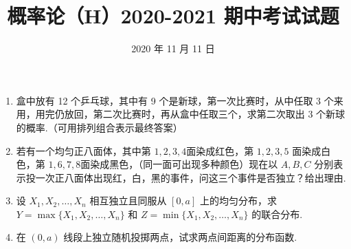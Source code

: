 \documentclass{ctexart}
\title{\vspace{-4em}\textbf{概率论（H）2020-2021 期中考试试题}}
\date{\vspace{-2em}2020 年 11 月 11 日}
\begin{document}
\maketitle
\thispagestyle{empty}

\begin{enumerate}
    \item 盒中放有 12 个乒乓球，其中有 9 个是新球，第一次比赛时，从中任取 3 个来用，用完仍放回，第二次比赛时，再从盒中任取三个，求第二次取出 3 个新球的概率.（可用排列组合表示最终答案）\vspace{10em}

    \item 若有一个均匀正八面体，其中第 $ 1, 2, 3, 4 $面染成红色，第 $ 1, 2, 3, 5 $ 面染成白色，第 $ 1, 6, 7, 8 $面染成黑色，（同一面可出现多种颜色）现在以 $ A, B, C $ 分别表示投一次正八面体出现红，白，黑的事件，问这三个事件是否独立？给出理由.\vspace{10em}

    \item 设 $ X_1, X_2, \ldots, X_n $ 相互独立且同服从 $ [0, a] $ 上的均匀分布，求 $ Y = \max\{X_1, X_2, \ldots, X_n\} $ 和 $ Z = \min\{X_1, X_2, \ldots, X_n\} $ 的联合分布.\vspace{10em}

    \item 在 $ (0, a) $ 线段上独立随机投掷两点，试求两点间距离的分布函数.
\end{enumerate}
\end{document}
